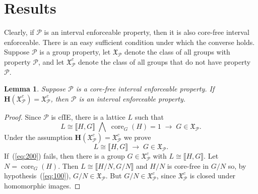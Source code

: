 \documentclass{gen-j-l}
\newcommand{\lb}{\ensuremath{\llbracket}}
\newcommand{\rb}{\ensuremath{\rrbracket}}
\newcommand{\<}{\ensuremath{\langle}}
\renewcommand{\>}{\ensuremath{\rangle}}
\theoremstyle{plain}
\newtheorem{lemma}[theorem]{Lemma}
\theoremstyle{definition}
\theoremstyle{remark}
\numberwithin{theorem}{section}
\numberwithin{claim}{section}
\numberwithin{equation}{section}
\numberwithin{conjecture}{section}
\newcommand{\Meet}{\ensuremath{\bigwedge}}
\newcommand{\core}{\ensuremath{\operatorname{core}}}
\newcommand{\2}{\ensuremath{\mathbf{2}}}
\newcommand{\3}{\ensuremath{\mathbf{3}}}
\newcommand{\sG}{\ensuremath{\mathfrak{X}}}
\newcommand{\bH}{\ensuremath{\mathbf{H}}}
\newcommand{\cP}{\ensuremath{\mathcal{P}}}
\begin{document}
\section{Results}
Clearly, if $\cP$ is an interval enforceable property, then it is also
core-free interval enforceable.  There is an easy
sufficient condition under which the converse holds.  
Suppose $\cP$ is a group property, let $\sG_{\cP}$  denote the
class of all groups with property $\cP$, and let
 $\sG_{\cP}^c$ denote the class of all groups that do not have property $\cP$.
\begin{lemma}
\label{lemma-wjd-2}
Suppose $\cP$ is a core-free interval enforceable property.  
If $\bH(\sG_{\cP}^c) = \sG_{\cP}^c$, then $\cP$ is an interval enforceable property.
\end{lemma}
\begin{proof}
Since $\cP$ is \acs{cfIE}, there is a lattice $L$ such that
\begin{equation}
  \label{eq:100}
L \cong \lb H,G \rb \; \Meet \; \core_G(H)=1 \; \longrightarrow \; G\in \sG_\cP.
\end{equation}
Under the assumption $\bH(\sG_\cP^c) = \sG_\cP^c$ we prove
\begin{equation}
  \label{eq:200}
L \cong \lb H,G \rb \; \longrightarrow \; G\in \sG_\cP.
\end{equation}
If~(\ref{eq:200}) fails, then there is a
group $G\in \sG_{\cP}^c$ with $L\cong \lb H,G \rb$.  Let $N = \core_G(H)$.  Then $L \cong
\lb H/N,G/N \rb$ and $H/N$ is core-free in $G/N$ so, by hypothesis~(\ref{eq:100}),
$G/N \in \sG_\cP$.  But $G/N \in \sG_{\cP}^c$, since $\sG_{\cP}^c$ is closed under homomorphic images.
\end{proof}
\end{document}
